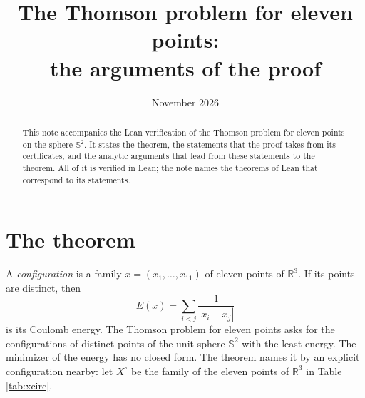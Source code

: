 \documentclass[reqno,a4paper,11pt]{amsart}
\numberwithin{equation}{section}
\def\R{{\mathbb R}}
\newcommand{\Sph}{\mathbb{S}}
\begin{document}
\title[The Thomson problem for eleven points]{The Thomson problem for eleven points:\\ the arguments of the proof}

\date{November 2026}

\begin{abstract}
This note accompanies the Lean verification of the Thomson problem for eleven points on the sphere $\Sph^2$. It states the theorem, the statements that the proof takes from its certificates, and the analytic arguments that lead from these statements to the theorem. All of it is verified in Lean; the note names the theorems of Lean that correspond to its statements.
\end{abstract}

\maketitle

\section{The theorem}\label{sec:theorem}

A \emph{configuration} is a family $x = (x_1, \dots, x_{11})$ of eleven points of $\R^3$. If its points are distinct, then
$$
E(x) = \sum_{i<j} \frac{1}{|x_i - x_j|}
$$
is its Coulomb energy. The Thomson problem for eleven points asks for the configurations of distinct points of the unit sphere $\Sph^2$ with the least energy. The minimizer of the energy has no closed form. The theorem names it by an explicit configuration nearby: let $X^{\circ}$ be the family of the eleven points of $\R^3$ in Table \ref{tab:xcirc}.
\end{document}
